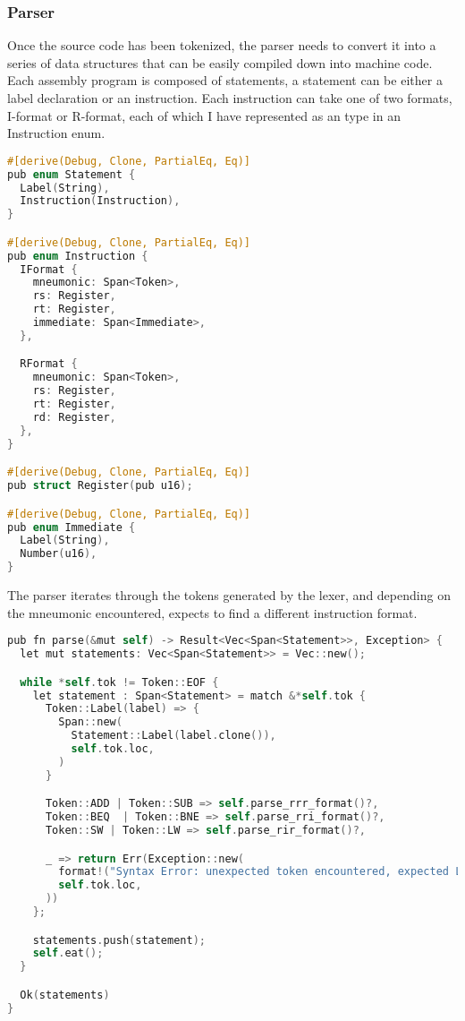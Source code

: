 \subsubsection{Parser}
Once the source code has been tokenized, the parser needs to convert it into a series of data structures that can be easily compiled down into machine code. Each assembly program is composed of statements, a statement can be either a label declaration or an instruction. Each instruction can take one of two formats, I-format or R-format, each of which I have represented as an type in an Instruction enum.

\begin{lstlisting}[language=C]
#[derive(Debug, Clone, PartialEq, Eq)]
pub enum Statement {
  Label(String),
  Instruction(Instruction),
}

#[derive(Debug, Clone, PartialEq, Eq)]
pub enum Instruction {
  IFormat {
    mneumonic: Span<Token>,
    rs: Register,
    rt: Register,
    immediate: Span<Immediate>,
  },

  RFormat {
    mneumonic: Span<Token>,
    rs: Register,
    rt: Register,
    rd: Register,
  },
}

#[derive(Debug, Clone, PartialEq, Eq)]
pub struct Register(pub u16);

#[derive(Debug, Clone, PartialEq, Eq)]
pub enum Immediate {
  Label(String),
  Number(u16),
}
\end{lstlisting}

The parser iterates through the tokens generated by the lexer, and depending on the mneumonic encountered, expects to find a different instruction format.

\begin{lstlisting}[language=C]
pub fn parse(&mut self) -> Result<Vec<Span<Statement>>, Exception> {
  let mut statements: Vec<Span<Statement>> = Vec::new();

  while *self.tok != Token::EOF {
    let statement : Span<Statement> = match &*self.tok {
      Token::Label(label) => {
        Span::new(
          Statement::Label(label.clone()),
          self.tok.loc,
        )
      }

      Token::ADD | Token::SUB => self.parse_rrr_format()?,
      Token::BEQ  | Token::BNE => self.parse_rri_format()?,
      Token::SW | Token::LW => self.parse_rir_format()?,

      _ => return Err(Exception::new(
        format!("Syntax Error: unexpected token encountered, expected LABEL or INSTRUCTION, got '{:?}'", *self.tok),
        self.tok.loc,
      ))
    };

    statements.push(statement);
    self.eat();
  }

  Ok(statements)
}
\end{lstlisting}

